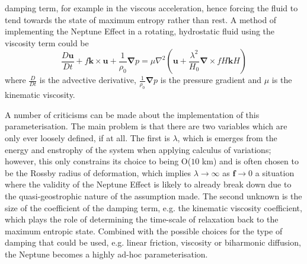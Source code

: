 \documentclass[12pt,a4paper]{report}
\begin{document}
                	 damping term, for example in the viscous acceleration, hence forcing
                	  the fluid to tend towards the state of maximum entropy rather than rest.  
                	A method of implementing the Neptune Effect in a rotating, hydrostatic fluid using the viscosity term could be
                	\begin{equation}
                	\frac{D \boldsymbol{u}}{Dt}
                		+f\boldsymbol{k}\times\boldsymbol{u}+
                		\frac{1}{\rho_{0}}\boldsymbol{\nabla}p
                		 = \mu \nabla^{2}\left(\boldsymbol{u}
                		+\frac{\lambda^{2}}{H_{0}}
                		\boldsymbol{\nabla}\times fH\boldsymbol{k}H\right)
                	\end{equation}
                	where $\frac{D }{Dt}$ is the advective derivative, 
                	$\frac{1}{\rho_{0}}\boldsymbol{\nabla}p$ is the pressure gradient and
                	$\mu $ is the kinematic viscosity.
                	
                	 A number of criticisms can be made about the implementation of this
                	  parameterisation. The main problem is that there are two variables
                	   which are only ever loosely defined, if at all. The first is
                	    $\lambda$, which is emerges from the energy and enstrophy of the
                	     system when applying calculus of variations; however, this only
                	      constrains its choice to being  O($10$ km) and is often chosen to
                	       be the Rossby radius of deformation, which implies $\lambda
                	        \rightarrow \infty$ as  $\boldsymbol{f} \rightarrow 0$   a
                	         situation where the validity of the Neptune Effect is likely to already break down due to the quasi-geostrophic nature of
                	          the assumption made. The second unknown is the size of the
                	           coefficient of the damping term, e.g. the kinematic
                	            viscosity coefficient, which plays the role of determining
                	             the time-scale of relaxation back to the maximum entropic
                	              state. Combined with the possible choices for the type of
                	               damping that could be used, e.g. linear friction,
                	                viscosity or biharmonic diffusion, the Neptune becomes
                	                 a highly ad-hoc parameterisation. 
                	 
\end{document}
